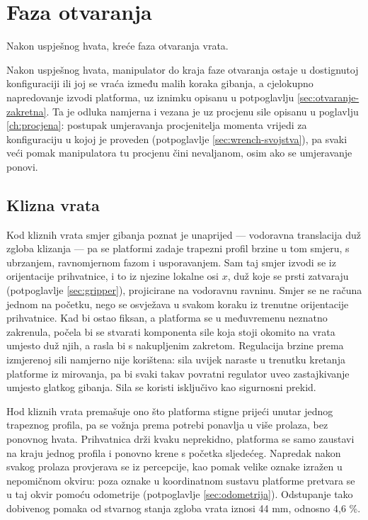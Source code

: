 \section{Faza otvaranja}
\label{sec:otvaranje}

Nakon uspješnog hvata, kreće faza otvaranja vrata.

Nakon uspješnog hvata, manipulator do kraja faze otvaranja ostaje u dostignutoj konfiguraciji
ili joj se vraća između malih koraka gibanja, a cjelokupno napredovanje izvodi platforma, uz
iznimku opisanu u potpoglavlju \ref{sec:otvaranje-zakretna}. Ta je odluka namjerna i vezana je
uz procjenu sile opisanu u poglavlju \ref{ch:procjena}: postupak umjeravanja procjenitelja
momenta vrijedi za konfiguraciju u kojoj je proveden (potpoglavlje \ref{sec:wrench-svojstva}),
pa svaki veći pomak manipulatora tu procjenu čini nevaljanom, osim ako se umjeravanje ponovi.

\subsection{Klizna vrata}
\label{sec:otvaranje-klizna}

Kod kliznih vrata smjer gibanja poznat je unaprijed --- vodoravna translacija duž zgloba
klizanja --- pa se platformi zadaje trapezni profil brzine u tom smjeru, s ubrzanjem,
ravnomjernom fazom i usporavanjem. Sam taj smjer izvodi se iz orijentacije
prihvatnice, i to iz njezine lokalne osi $x$, duž koje se prsti zatvaraju (potpoglavlje
\ref{sec:gripper}), projicirane na vodoravnu ravninu. Smjer se ne računa jednom na početku, nego se
osvježava u svakom koraku iz trenutne orijentacije prihvatnice. Kad bi ostao fiksan, a platforma
se u međuvremenu neznatno zakrenula, počela bi se stvarati komponenta sile koja stoji okomito na vrata
umjesto duž njih, a rasla bi s nakupljenim zakretom. Regulacija brzine prema izmjerenoj
sili namjerno nije korištena: sila uvijek naraste u trenutku kretanja platforme iz mirovanja, pa
bi svaki takav povratni regulator uveo zastajkivanje umjesto glatkog gibanja. Sila se koristi
isključivo kao sigurnosni prekid.

Hod kliznih vrata premašuje ono što platforma stigne prijeći unutar jednog trapeznog profila, pa
se vožnja prema potrebi ponavlja u više prolaza, bez ponovnog hvata. Prihvatnica drži
kvaku neprekidno, platforma se samo zaustavi na kraju jednog profila i ponovno krene s početka
sljedećeg. Napredak nakon svakog prolaza provjerava se iz percepcije, kao pomak velike oznake
izražen u nepomičnom okviru: poza oznake u koordinatnom sustavu platforme pretvara se u taj okvir
pomoću odometrije (potpoglavlje \ref{sec:odometrija}). Odstupanje tako dobivenog pomaka od
stvarnog stanja zgloba vrata iznosi 44 mm, odnosno 4,6 \%.


